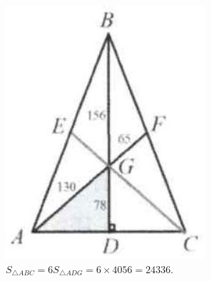 \documentclass{article}
\begin{document}
\includegraphics[width=\textwidth]{images/010.jpg}\\
\(S_{\triangle A B C}=6 S_{\triangle A D G}=6 \times 4056=24336\).\\
\end{document}
